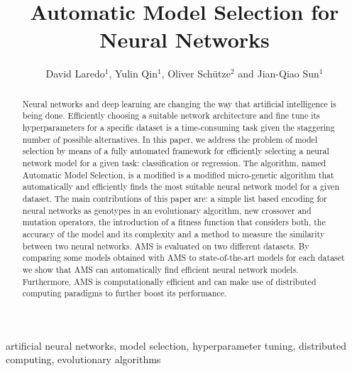 
\begin{frontmatter}

\title{Automatic Model Selection for Neural Networks}

\author{David Laredo$^{1}$, Yulin Qin$^{1}$, Oliver Sch\"utze$^{2}$ and Jian-Qiao Sun$^{1}$}
\address{
$^{1}$Department of Mechanical Engineering, School of Engineering\\
University of California, Merced, CA 95343, USA\\
$^{2}$Department of Computer Science, CINVESTAV, Mexico City, Mexico\\
Corresponding author: Jian-Qiao Sun. Email: jqsun@ucmerced.edu}

\begin{abstract}
Neural networks and deep learning are changing the way that artificial intelligence is being done. Efficiently choosing a suitable network architecture and fine tune its hyperparameters for a specific dataset is a time-consuming task given the staggering number of possible alternatives. In this paper, we address the problem of model selection by means of a fully automated framework for efficiently selecting a neural network model for a given task: classification or regression. The algorithm, named Automatic Model Selection, is a modified is a modified micro-genetic algorithm that automatically and efficiently finds the most suitable neural network model for a given dataset. The main contributions of this paper are: a simple list based encoding for neural networks as genotypes in an evolutionary algorithm, new crossover and mutation operators, the introduction of a fitness function that considers both, the accuracy of the model and its complexity and a method to measure the similarity between two neural networks. AMS is evaluated on two different datasets. By comparing some models obtained with AMS to state-of-the-art models for each dataset we show that AMS can automatically find efficient neural network models. Furthermore, AMS is computationally efficient and can make use of distributed computing paradigms to further boost its performance. 
\end{abstract}


\begin{keyword}
artificial neural networks\sep
model selection\sep
hyperparameter tuning\sep
distributed computing\sep
evolutionary algorithms
\end{keyword}

\end{frontmatter}

